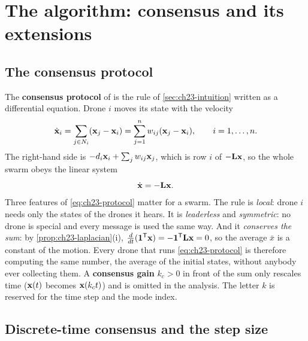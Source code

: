 \section{The algorithm: consensus and its extensions}
\label{sec:ch23-algorithm}

\subsection{The consensus protocol}
\label{sec:ch23-protocol}

The \textbf{consensus protocol} of
\textcite{olfatisaber2004consensus} is the rule of \cref{sec:ch23-intuition}
written as a differential equation. Drone $i$ moves its state with the velocity
\begin{equation}
  \dot{\mathbf{x}}_i = \sum_{j \in N_i} (\mathbf{x}_j - \mathbf{x}_i)
  = \sum_{j=1}^{n} w_{ij} (\mathbf{x}_j - \mathbf{x}_i), \qquad i = 1, \dots, n.
  \label{eq:ch23-protocol}
\end{equation}
The right-hand side is $-d_i \mathbf{x}_i + \sum_j w_{ij} \mathbf{x}_j$, which is
row $i$ of $-\mathbf{L}\mathbf{x}$, so the whole swarm obeys the linear system
\begin{equation}
  \dot{\mathbf{x}} = -\mathbf{L}\mathbf{x}.
  \label{eq:ch23-matrix}
\end{equation}
Three features of \cref{eq:ch23-protocol} matter for a swarm. The rule is
\emph{local}: drone $i$ needs only the states of the drones it hears. It is
\emph{leaderless} and \emph{symmetric}: no drone is special and every message
is used the same way. And it \emph{conserves the sum}: by
\cref{prop:ch23-laplacian}(i), $\frac{d}{dt}(\mathbf{1}^{\mathsf{T}}\mathbf{x}) =
-\mathbf{1}^{\mathsf{T}}\mathbf{L}\mathbf{x} = 0$, so the average $\bar{x}$ is a constant of the
motion. Every drone that runs \cref{eq:ch23-protocol} is therefore computing
the same number, the average of the initial states, without anybody ever
collecting them. A \textbf{consensus gain} $k_c > 0$
in front of the sum only rescales time ($\mathbf{x}(t)$ becomes
$\mathbf{x}(k_c t)$) and is omitted in the analysis. The letter $k$ is reserved
for the time step and the mode index.

\subsection{Discrete-time consensus and the step size}
\label{sec:ch23-discrete}

